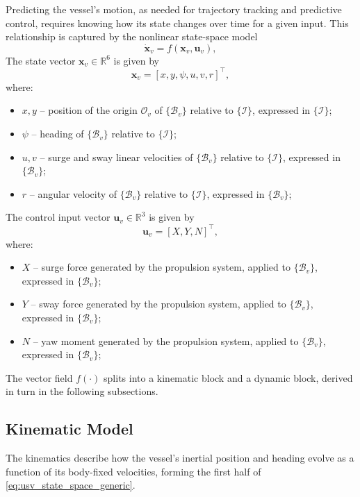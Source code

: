 Predicting the vessel's motion, as needed for trajectory tracking and predictive control, requires knowing how its state changes over time for a given input. This relationship is captured by the nonlinear state-space model
\begin{equation}
    \label{eq:usv_state_space_generic}
    \dot{\mathbf{x}}_v = f(\mathbf{x}_v, \mathbf{u}_v),
\end{equation}
The state vector $\mathbf{x}_v \in \mathbb{R}^6$ is given by
\begin{equation}
    \label{eq:usv_state_vector}
    \mathbf{x}_v = [x, y, \psi, u, v, r]^\top,
\end{equation}
where:
\begin{itemize}
    \item $x, y$ -- position of the origin $\mathcal{O}_v$ of $\{\mathcal{B}_v\}$ relative to $\{\mathcal{I}\}$, expressed in $\{\mathcal{I}\}$;
    \item $\psi$ -- heading of $\{\mathcal{B}_v\}$ relative to $\{\mathcal{I}\}$;
    \item $u, v$ -- surge and sway linear velocities of $\{\mathcal{B}_v\}$ relative to $\{\mathcal{I}\}$, expressed in $\{\mathcal{B}_v\}$;
    \item $r$ -- angular velocity of $\{\mathcal{B}_v\}$ relative to $\{\mathcal{I}\}$, expressed in $\{\mathcal{B}_v\}$;
\end{itemize}
The control input vector $\mathbf{u}_v \in \mathbb{R}^3$ is given by
\begin{equation}
    \label{eq:usv_input_vector}
    \mathbf{u}_v = [X, Y, N]^\top,
\end{equation}
where:
\begin{itemize}
    \item $X$ -- surge force generated by the propulsion system, applied to $\{\mathcal{B}_v\}$, expressed in $\{\mathcal{B}_v\}$;
    \item $Y$ -- sway force generated by the propulsion system, applied to $\{\mathcal{B}_v\}$, expressed in $\{\mathcal{B}_v\}$;
    \item $N$ -- yaw moment generated by the propulsion system, applied to $\{\mathcal{B}_v\}$, expressed in $\{\mathcal{B}_v\}$;
\end{itemize}
The vector field $f(\cdot)$ splits into a kinematic block and a dynamic block, derived in turn in the following subsections.

\subsection{Kinematic Model}
\label{subsec:mod_usv_kinematics}
The kinematics describe how the vessel's inertial position and heading evolve as a function of its body-fixed velocities, forming the first half of \eqref{eq:usv_state_space_generic}.

